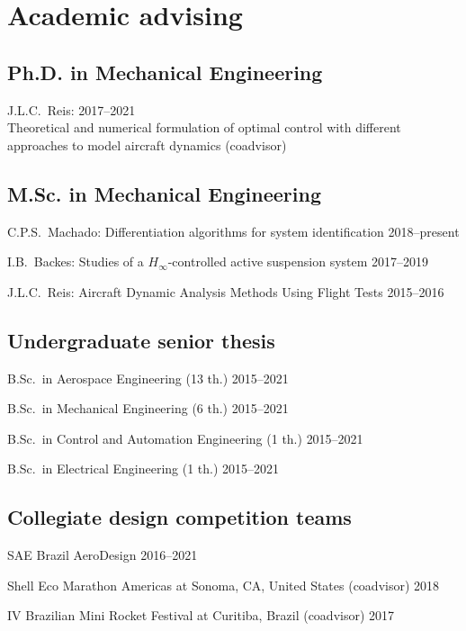 \documentclass[a4paper, 11pt, oneside]{memoir}
\begin{document}
\section{Academic advising}
\subsection{Ph.D. in Mechanical Engineering}
\begin{shortdesc}
\item {\textnormal{J.L.C.~Reis}}:
\hfill 2017--2021\\
Theoretical and numerical formulation of optimal control with different
approaches to model aircraft dynamics (coadvisor)
\end{shortdesc}

\subsection{M.Sc. in Mechanical Engineering}
\begin{shortdesc}
\item{\textnormal{C.P.S.~Machado:}} 
{Differentiation algorithms for system identification}
\hfill{2018--present}

\item {\textnormal{I.B.~Backes}}:
  {Studies of a $H_\infty$-controlled active suspension system}{}{}{}
  \hfill {2017--2019}

\item {\textnormal{J.L.C.~Reis}}:
  {Aircraft Dynamic Analysis Methods Using Flight Tests}{}{}{}
  \hfill {2015--2016}
\end{shortdesc}

\subsection{Undergraduate senior thesis}
\begin{shortdesc}
\item
  B.Sc.~in Aerospace Engineering (13 th.) \hfill {2015--2021}
\item
  B.Sc.~in Mechanical Engineering (6 th.) \hfill {2015--2021}
\item
  B.Sc.~in Control and Automation Engineering (1 th.) \hfill {2015--2021} 
\item
  B.Sc.~in Electrical Engineering (1 th.) \hfill {2015--2021} 
\end{shortdesc}

\subsection{Collegiate design competition teams}
\begin{shortdesc}
\item {SAE Brazil AeroDesign} \hfill 2016--2021
\item
{Shell Eco Marathon Americas at Sonoma, CA, United States (coadvisor)}
\hfill {2018}%
\item {IV Brazilian Mini Rocket Festival at Curitiba, Brazil (coadvisor)}
  \hfill {2017}
\end{shortdesc}
\end{document}
